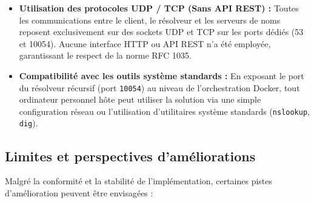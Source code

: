 \begin{itemize}
    \item \textbf{Utilisation des protocoles UDP / TCP (Sans API REST) :}
    Toutes les communications entre le client, le résolveur et les serveurs de noms reposent exclusivement sur des sockets UDP et TCP sur les ports dédiés (53 et 10054). Aucune interface HTTP ou API REST n'a été employée, garantissant le respect de la norme RFC 1035.

    \item \textbf{Compatibilité avec les outils système standards :}
    En exposant le port du résolveur récursif (port \texttt{10054}) au niveau de l'orchestration Docker, tout ordinateur personnel hôte peut utiliser la solution via une simple configuration réseau ou l'utilisation d'utilitaires système standards (\texttt{nslookup}, \texttt{dig}).
\end{itemize}

\subsection{Limites et perspectives d'améliorations}
Malgré la conformité et la stabilité de l'implémentation, certaines pistes d'amélioration peuvent être envisagées :

